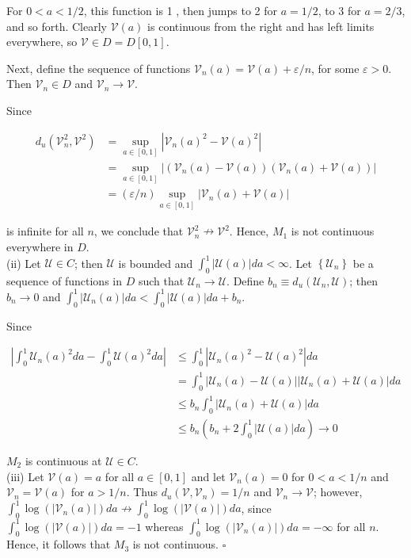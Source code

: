 \documentclass[10pt]{article}
\begin{document}
For $0<a<1 / 2$, this function is 1 , then jumps to 2 for $a=1 / 2$, to 3 for $a=2 / 3$, and so forth. Clearly $\mathcal{V}(a)$ is continuous from the right and has left limits everywhere, so $\mathcal{V} \in D=D[0,1]$.

Next, define the sequence of functions $\mathcal{V}_{n}(a)=\mathcal{V}(a)+\varepsilon / n$, for some $\varepsilon>0$. Then $\mathcal{V}_{n} \in D$ and $\mathcal{V}_{n} \rightarrow \mathcal{V}$.

Since

$$
\begin{aligned}
d_{u}\left(\mathcal{V}_{n}^{2}, \mathcal{V}^{2}\right) & =\sup _{a \in[0,1]}\left|\mathcal{V}_{n}(a)^{2}-\mathcal{V}(a)^{2}\right| \\
& =\sup _{a \in[0,1]}\left|\left(\mathcal{V}_{n}(a)-\mathcal{V}(a)\right)\left(\mathcal{V}_{n}(a)+\mathcal{V}(a)\right)\right| \\
& =(\varepsilon / n) \sup _{a \in[0,1]}\left|\mathcal{V}_{n}(a)+\mathcal{V}(a)\right|
\end{aligned}
$$

is infinite for all $n$, we conclude that $\mathcal{V}_{n}^{2} \nrightarrow \mathcal{V}^{2}$. Hence, $M_{1}$ is not continuous everywhere in $D$.\\
(ii) Let $\mathcal{U} \in C$; then $\mathcal{U}$ is bounded and $\int_{0}^{1}|\mathcal{U}(a)| d a<\infty$. Let $\left\{\mathcal{U}_{n}\right\}$ be a sequence of functions in $D$ such that $\mathcal{U}_{n} \rightarrow \mathcal{U}$. Define $b_{n} \equiv d_{u}\left(\mathcal{U}_{n}, \mathcal{U}\right)$; then $b_{n} \rightarrow 0$ and $\int_{0}^{1}\left|\mathcal{U}_{n}(a)\right| d a<\int_{0}^{1}|\mathcal{U}(a)| d a+b_{n}$.

Since

$$
\begin{aligned}
\left|\int_{0}^{1} \mathcal{U}_{n}(a)^{2} d a-\int_{0}^{1} \mathcal{U}(a)^{2} d a\right| & \leq \int_{0}^{1}\left|\mathcal{U}_{n}(a)^{2}-\mathcal{U}(a)^{2}\right| d a \\
& =\int_{0}^{1}\left|\mathcal{U}_{n}(a)-\mathcal{U}(a)\right|\left|\mathcal{U}_{n}(a)+\mathcal{U}(a)\right| d a \\
& \leq b_{n} \int_{0}^{1}\left|\mathcal{U}_{n}(a)+\mathcal{U}(a)\right| d a \\
& \leq b_{n}\left(b_{n}+2 \int_{0}^{1}|\mathcal{U}(a)| d a\right) \rightarrow 0
\end{aligned}
$$

$M_{2}$ is continuous at $\mathcal{U} \in C$.\\
(iii) Let $\mathcal{V}(a)=a$ for all $a \in[0,1]$ and let $\mathcal{V}_{n}(a)=0$ for $0<a< 1 / n$ and $\mathcal{V}_{n}=\mathcal{V}(a)$ for $a>1 / n$. Thus $d_{u}\left(\mathcal{V}, \mathcal{V}_{n}\right)=1 / n$ and $\mathcal{V}_{n} \rightarrow \mathcal{V}$; however, $\int_{0}^{1} \log \left(\left|\mathcal{V}_{n}(a)\right|\right) d a \nrightarrow \int_{0}^{1} \log (|\mathcal{V}(a)|) d a$, since $\int_{0}^{1} \log (|\mathcal{V}(a)|) d a=-1$ whereas $\int_{0}^{1} \log \left(\left|\mathcal{V}_{n}(a)\right|\right) d a=-\infty$ for all $n$. Hence, it follows that $M_{3}$ is not continuous. \(\square\)
\end{document}
